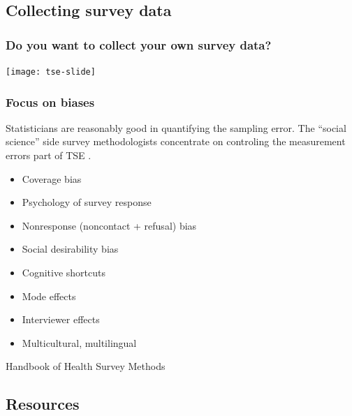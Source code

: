 \documentclass[handout]{beamer}
\begin{document}
\subsection{Collecting survey data}

\begin{frame}\frametitle{Do you want to collect your own survey data?}

\centering

\texttt{[image: tse-slide]}

\end{frame}

\begin{frame}\frametitle{Focus on biases}

Statisticians are reasonably good in quantifying the sampling error. 
The ``social science'' side survey methodologists concentrate on controling 
the measurement errors part of TSE
\citep{grov:fowl:coup:lepk:sing:tour:2009,groves:lyberg:2010}.

\begin{itemize}
    \item Coverage bias
    \item Psychology of survey response
    \item Nonresponse (noncontact + refusal) bias
    \item Social desirability bias
    \item Cognitive shortcuts
    \item Mode effects
    \item Interviewer effects
    \item Multicultural, multilingual
\end{itemize}

Handbook of Health Survey Methods \citep{johnson:2015:handbook}

\end{frame}

\subsection{Resources}
\end{document}
